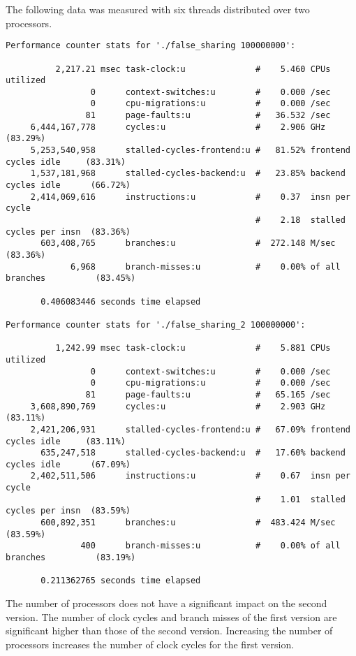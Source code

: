 \documentclass[parskip]{scrartcl}
\begin{document}
  	The following data was measured with six threads distributed over two processors.
  	{\footnotesize
  	\begin{verbatim}     
Performance counter stats for './false_sharing 100000000':

          2,217.21 msec task-clock:u              #    5.460 CPUs utilized          
                 0      context-switches:u        #    0.000 /sec                   
                 0      cpu-migrations:u          #    0.000 /sec                   
                81      page-faults:u             #   36.532 /sec                   
     6,444,167,778      cycles:u                  #    2.906 GHz                      (83.29%)
     5,253,540,958      stalled-cycles-frontend:u #   81.52% frontend cycles idle     (83.31%)
     1,537,181,968      stalled-cycles-backend:u  #   23.85% backend cycles idle      (66.72%)
     2,414,069,616      instructions:u            #    0.37  insn per cycle         
                                                  #    2.18  stalled cycles per insn  (83.36%)
       603,408,765      branches:u                #  272.148 M/sec                    (83.36%)
             6,968      branch-misses:u           #    0.00% of all branches          (83.45%)

       0.406083446 seconds time elapsed
       
Performance counter stats for './false_sharing_2 100000000':

          1,242.99 msec task-clock:u              #    5.881 CPUs utilized          
                 0      context-switches:u        #    0.000 /sec                   
                 0      cpu-migrations:u          #    0.000 /sec                   
                81      page-faults:u             #   65.165 /sec                   
     3,608,890,769      cycles:u                  #    2.903 GHz                      (83.11%)
     2,421,206,931      stalled-cycles-frontend:u #   67.09% frontend cycles idle     (83.11%)
       635,247,518      stalled-cycles-backend:u  #   17.60% backend cycles idle      (67.09%)
     2,402,511,506      instructions:u            #    0.67  insn per cycle         
                                                  #    1.01  stalled cycles per insn  (83.59%)
       600,892,351      branches:u                #  483.424 M/sec                    (83.59%)
               400      branch-misses:u           #    0.00% of all branches          (83.19%)

       0.211362765 seconds time elapsed
	\end{verbatim}
	}
	The number of processors does not have a significant impact on the second version.  The number of clock cycles and branch misses of the first version are significant higher than those of the second version. Increasing the number of processors increases the number of clock cycles for the first version.
	
\end{document}
